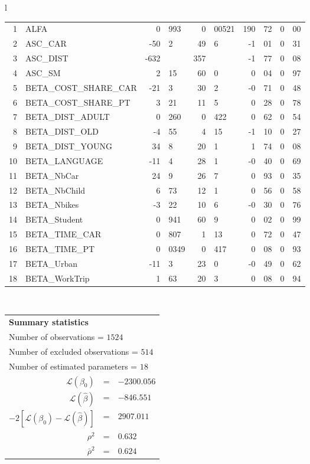 \begin{tabular}{l}
\begin{tabular}{rlr@{.}lr@{.}lr@{.}lr@{.}l}
1 & ALFA & 0&993 & 0&00521 & 190&72 & 0&00\\
2 & ASC_CAR & -50&2 & 49&6 & -1&01 & 0&31\\
3 & ASC_DIST & -632& & 357& & -1&77 & 0&08\\
4 & ASC_SM & 2&15 & 60&0 & 0&04 & 0&97\\
5 & BETA_COST_SHARE_CAR & -21&3 & 30&2 & -0&71 & 0&48\\
6 & BETA_COST_SHARE_PT & 3&21 & 11&5 & 0&28 & 0&78\\
7 & BETA_DIST_ADULT & 0&260 & 0&422 & 0&62 & 0&54\\
8 & BETA_DIST_OLD & -4&55 & 4&15 & -1&10 & 0&27\\
9 & BETA_DIST_YOUNG & 34&8 & 20&1 & 1&74 & 0&08\\
10 & BETA_LANGUAGE & -11&4 & 28&1 & -0&40 & 0&69\\
11 & BETA_NbCar & 24&9 & 26&7 & 0&93 & 0&35\\
12 & BETA_NbChild & 6&73 & 12&1 & 0&56 & 0&58\\
13 & BETA_Nbikes & -3&22 & 10&6 & -0&30 & 0&76\\
14 & BETA_Student & 0&941 & 60&9 & 0&02 & 0&99\\
15 & BETA_TIME_CAR & 0&807 & 1&13 & 0&72 & 0&47\\
16 & BETA_TIME_PT & 0&0349 & 0&417 & 0&08 & 0&93\\
17 & BETA_Urban & -11&3 & 23&0 & -0&49 & 0&62\\
18 & BETA_WorkTrip & 1&63 & 20&3 & 0&08 & 0&94\\
\hline
\end{tabular}
\\
\begin{tabular}{rcl}
\multicolumn{3}{l}{\bf Summary statistics}\\
\multicolumn{3}{l}{ Number of observations = $1524$} \\
\multicolumn{3}{l}{ Number of excluded observations = $514$} \\
\multicolumn{3}{l}{ Number of estimated  parameters = $18$} \\
 $\mathcal{L}(\beta_0)$ &=&  $-2300.056$ \\
 $\mathcal{L}(\hat{\beta})$ &=& $-846.551 $  \\
 $-2[\mathcal{L}(\beta_0) -\mathcal{L}(\hat{\beta})]$ &=& $2907.011$ \\
    $\rho^2$ &=&   $0.632$ \\
    $\bar{\rho}^2$ &=&    $0.624$ \\
\end{tabular}
  \end{tabular}
